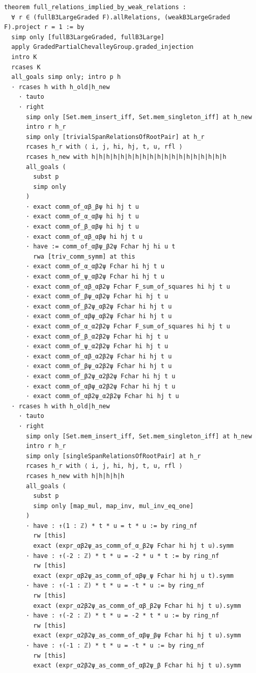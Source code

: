 \begin{Verbatim}
theorem full_relations_implied_by_weak_relations :
  ∀ r ∈ (fullB3LargeGraded F).allRelations, (weakB3LargeGraded F).project r = 1 := by
  simp only [fullB3LargeGraded, fullB3Large]
  apply GradedPartialChevalleyGroup.graded_injection
  intro K
  rcases K
  all_goals simp only; intro p h
  · rcases h with h_old|h_new
    · tauto
    · right
      simp only [Set.mem_insert_iff, Set.mem_singleton_iff] at h_new
      intro r h_r
      simp only [trivialSpanRelationsOfRootPair] at h_r
      rcases h_r with ⟨ i, j, hi, hj, t, u, rfl ⟩
      rcases h_new with h|h|h|h|h|h|h|h|h|h|h|h|h|h|h|h|h|h|h
      all_goals (
        subst p
        simp only
      )
      · exact comm_of_αβ_βψ hi hj t u
      · exact comm_of_α_αβψ hi hj t u
      · exact comm_of_β_αβψ hi hj t u
      · exact comm_of_αβ_αβψ hi hj t u
      · have := comm_of_αβψ_β2ψ Fchar hj hi u t
        rwa [triv_comm_symm] at this
      · exact comm_of_α_αβ2ψ Fchar hi hj t u
      · exact comm_of_ψ_αβ2ψ Fchar hi hj t u
      · exact comm_of_αβ_αβ2ψ Fchar F_sum_of_squares hi hj t u
      · exact comm_of_βψ_αβ2ψ Fchar hi hj t u
      · exact comm_of_β2ψ_αβ2ψ Fchar hi hj t u
      · exact comm_of_αβψ_αβ2ψ Fchar hi hj t u
      · exact comm_of_α_α2β2ψ Fchar F_sum_of_squares hi hj t u
      · exact comm_of_β_α2β2ψ Fchar hi hj t u
      · exact comm_of_ψ_α2β2ψ Fchar hi hj t u
      · exact comm_of_αβ_α2β2ψ Fchar hi hj t u
      · exact comm_of_βψ_α2β2ψ Fchar hi hj t u
      · exact comm_of_β2ψ_α2β2ψ Fchar hi hj t u
      · exact comm_of_αβψ_α2β2ψ Fchar hi hj t u
      · exact comm_of_αβ2ψ_α2β2ψ Fchar hi hj t u
  · rcases h with h_old|h_new
    · tauto
    · right
      simp only [Set.mem_insert_iff, Set.mem_singleton_iff] at h_new
      intro r h_r
      simp only [singleSpanRelationsOfRootPair] at h_r
      rcases h_r with ⟨ i, j, hi, hj, t, u, rfl ⟩
      rcases h_new with h|h|h|h|h
      all_goals (
        subst p
        simp only [map_mul, map_inv, mul_inv_eq_one]
      )
      · have : ↑(1 : ℤ) * t * u = t * u := by ring_nf
        rw [this]
        exact (expr_αβ2ψ_as_comm_of_α_β2ψ Fchar hi hj t u).symm
      · have : ↑(-2 : ℤ) * t * u = -2 * u * t := by ring_nf
        rw [this]
        exact (expr_αβ2ψ_as_comm_of_αβψ_ψ Fchar hi hj u t).symm
      · have : ↑(-1 : ℤ) * t * u = -t * u := by ring_nf
        rw [this]
        exact (expr_α2β2ψ_as_comm_of_αβ_β2ψ Fchar hi hj t u).symm
      · have : ↑(-2 : ℤ) * t * u = -2 * t * u := by ring_nf
        rw [this]
        exact (expr_α2β2ψ_as_comm_of_αβψ_βψ Fchar hi hj t u).symm
      · have : ↑(-1 : ℤ) * t * u = -t * u := by ring_nf
        rw [this]
        exact (expr_α2β2ψ_as_comm_of_αβ2ψ_β Fchar hi hj t u).symm

\end{Verbatim}
